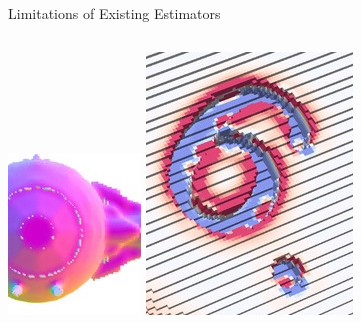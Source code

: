 \documentclass[11pt]{beamer}
\begin{document}
    \begin{frame}{Limitations of Existing Estimators}
        \centering
        \begin{columns}
            \includegraphics[width=0.85\linewidth]{pictures/tie256-IIN-flat-small-zoomed}
            \includegraphics[width=0.85\linewidth]{pictures/d20-H-II-small-zoomed}

\end{columns}
\end{frame}
\end{document}
